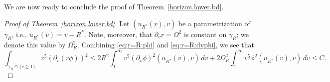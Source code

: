 \documentclass[12 pt, reqno]{amsart}
\theoremstyle{definition}
\theoremstyle{remark}
\numberwithin{equation}{section}
\newcommand{\set}[1]{\{#1\}}
\newcommand{\ud}{d}
\newcommand{\rd}{\partial}
\newcommand{\0}{\emptyset}
\newcommand{\gmm}{\gamma}
\newcommand{\Omg}{\Omega}
\begin{document}
We are now ready to conclude the proof of Theorem~\ref{horizon.lower.bd}.
\begin{proof} [Proof of Theorem~\ref{horizon.lower.bd}]
Let $(u_{R^{\ast}}(v), v)$ be a parametrization of $\gmm_{R}$, i.e., $u_{R^{\ast}}(v) = v - R^{\ast}$. Note, moreover, that $\rd_{v} r = \Omg^{2}$ is constant on $\gmm_{R}$; we denote this value by $\Omg_{R}^{2}$. Combining \eqref{eq:r=R:phi} and \eqref{eq:r=R:dvphi}, we see that
 \begin{equation*}
	\int_{\gmm_{R} \cap \set{v \geq 1}} v^{5} (\rd_{v} (r \phi))^{2} 
	\leq 2 R^{2} \int_{1}^{\infty} v^{5} (\rd_{v} \phi)^{2} (u_{R^{\ast}}(v), v) \, \ud v
		+ 2 \Omg^{2}_{R} \int_{1}^{\infty} v^{5} \phi^{2}(u_{R^{\ast}}(v), v) \, \ud v 
	\leq C.
\end{equation*}
\end{proof}
\end{document}
